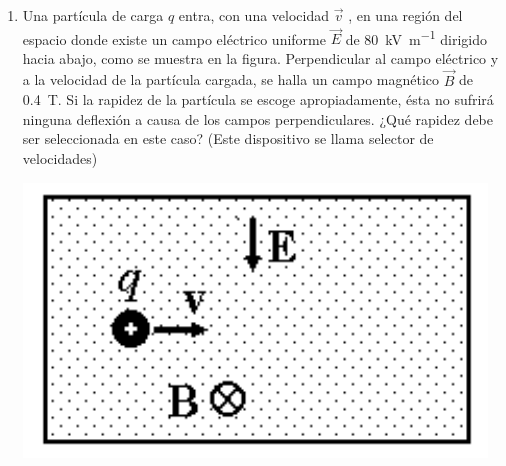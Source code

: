 \documentclass[11pt,spanish,a4paper]{article}
\begin{document}
\begin{enumerate}
 
  \item \begin{minipage}[t]{0.65\textwidth}
		 Una partícula de carga \(q\) entra, con una velocidad \(\vec{v}\) , en una región del espacio donde existe un campo eléctrico uniforme \(\vec{E}\) de \SI{80}{\kilo\volt\per\metre} dirigido hacia abajo, como se muestra en la figura.
Perpendicular al campo eléctrico y a la velocidad de la partícula cargada, se halla un campo magnético \(\vec{B}\) de \SI{0,4}{\tesla}.
Si la rapidez de la partícula se escoge apropiadamente, ésta no sufrirá ninguna deflexión a causa de los campos perpendiculares.
¿Qué rapidez debe ser seleccionada en este caso? (Este dispositivo se llama selector de velocidades)
	\end{minipage}
	\begin{minipage}[c][1em][t]{0.3\textwidth}
			\includegraphics[width=\textwidth]{p4e02}
	\end{minipage}



\end{enumerate}
\end{document}
